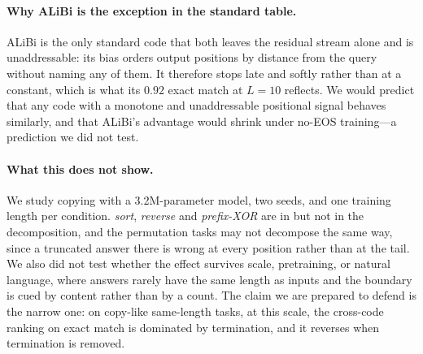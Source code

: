 \paragraph{Why ALiBi is the exception in the standard table.} ALiBi is the only
standard code that both leaves the residual stream alone and is unaddressable: its
bias orders output positions by distance from the query without naming any of them.
It therefore stops late and softly rather than at a constant, which is what its
$0.92$ exact match at $L{=}10$ reflects. We would predict that any code with a
monotone and unaddressable positional signal behaves similarly, and that ALiBi's
advantage would shrink under no-EOS training---a prediction we did not test.

\paragraph{What this does not show.} We study copying with a 3.2M-parameter model,
two seeds, and one training length per condition. \emph{sort}, \emph{reverse} and
\emph{prefix-XOR} are in  but not in the decomposition, and the
permutation tasks may not decompose the same way, since a truncated answer there is
wrong at every position rather than at the tail. We also did not test whether the
effect survives scale, pretraining, or natural language, where answers rarely have
the same length as inputs and the boundary is cued by content rather than by a
count. The claim we are prepared to defend is the narrow one: on copy-like
same-length tasks, at this scale, the cross-code ranking on exact match is dominated
by termination, and it reverses when termination is removed.
